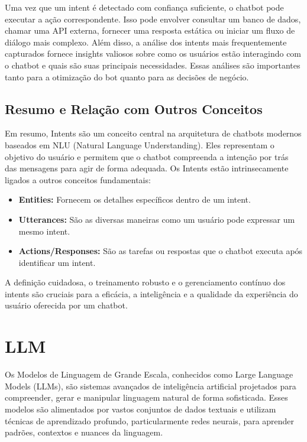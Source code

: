 \documentclass[14pt,a4paper,oneside]{book}
\begin{document}
Uma vez que um intent é detectado com confiança suficiente, o chatbot pode executar a ação correspondente. Isso pode envolver consultar um banco de dados, chamar uma API externa, fornecer uma resposta estática ou iniciar um fluxo de diálogo mais complexo. Além disso, a análise dos intents mais frequentemente capturados fornece insights valiosos sobre como os usuários estão interagindo com o chatbot e quais são suas principais necessidades. Essas análises são importantes tanto para a otimização do bot quanto para as decisões de negócio.

\section{Resumo e Relação com Outros Conceitos}
\label{sec:intents_resumo}

Em resumo, Intents são um conceito central na arquitetura de chatbots modernos baseados em NLU (Natural Language Understanding). Eles representam o objetivo do usuário e permitem que o chatbot compreenda a intenção por trás das mensagens para agir de forma adequada. Os Intents estão intrinsecamente ligados a outros conceitos fundamentais:
\begin{itemize}
    \item \textbf{Entities:} Fornecem os detalhes específicos dentro de um intent.
    \item \textbf{Utterances:} São as diversas maneiras como um usuário pode expressar um mesmo intent.
    \item \textbf{Actions/Responses:} São as tarefas ou respostas que o chatbot executa após identificar um intent.
\end{itemize}
A definição cuidadosa, o treinamento robusto e o gerenciamento contínuo dos intents são cruciais para a eficácia, a inteligência e a qualidade da experiência do usuário oferecida por um chatbot.




\chapter{LLM}

Os Modelos de Linguagem de Grande Escala, conhecidos como Large Language Models (LLMs), são sistemas avançados de inteligência artificial projetados para compreender, gerar e manipular linguagem natural de forma sofisticada. Esses modelos são alimentados por vastos conjuntos de dados textuais e utilizam técnicas de aprendizado profundo, particularmente redes neurais, para aprender padrões, contextos e nuances da linguagem.
\end{document}

